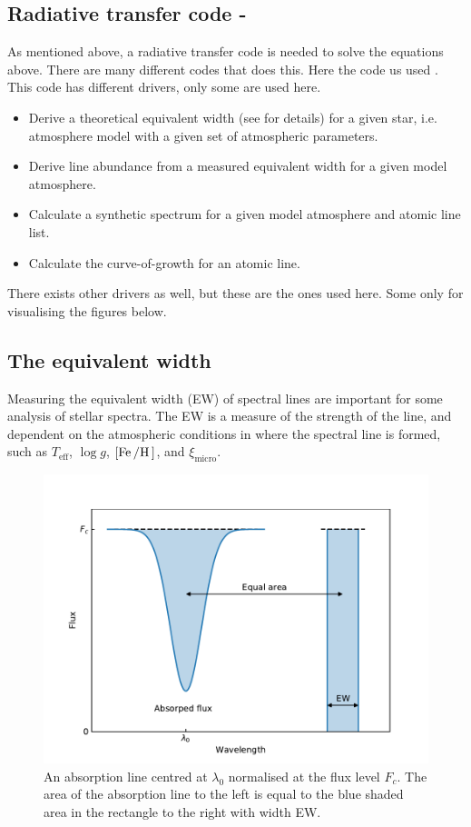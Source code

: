 \subsection{Radiative transfer code - \MOOG}

As mentioned above, a radiative transfer code is needed to solve the equations above. There are many
different codes that does this. Here the \MOOG code us used \citep{Sneden1973}. This code has
different drivers, only some are used here.

\begin{itemize}
  \item Derive a theoretical equivalent width (see  for details) for a given star, i.e.
        atmosphere model with a given set of atmospheric parameters.
  \item Derive line abundance from a measured equivalent width for a given model atmosphere.
  \item Calculate a synthetic spectrum for a given model atmosphere and atomic line list.
  \item Calculate the curve-of-growth for an atomic line.
\end{itemize}
There exists other drivers as well, but these are the ones used here. Some only for visualising the
figures below.



\subsection{The equivalent width}
\label{sec:EW}

Measuring the equivalent width (EW) of spectral lines are important for some analysis of stellar
spectra. The EW is a measure of the strength of the line, and dependent on the atmospheric
conditions in where the spectral line is formed, such as $T_\mathrm{eff}$, $\log g$,
$[\ion{Fe}/\ion{H}]$, and $\xi_\mathrm{micro}$.

\begin{figure}[htpb!]
    \centering
    \includegraphics[width=0.85\linewidth]{figures/ewTheoretical.pdf}
    \caption{An absorption line centred at $\lambda_0$ normalised at the flux level $F_c$. The area
             of the absorption line to the left is equal to the blue shaded area in the rectangle to
             the right with width EW.}
    \label{fig:ewTheoretical}
\end{figure}


